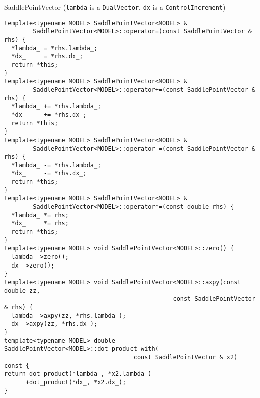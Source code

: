 \documentclass[9pt]{beamer}
\begin{document}
\begin{frame}[fragile]{SaddlePointVector (\lstinline|lambda| is a \lstinline|DualVector|, \lstinline|dx| is a \lstinline|ControlIncrement|) }
\begin{lstlisting}[basicstyle=\ttfamily\tiny]
template<typename MODEL> SaddlePointVector<MODEL> &
        SaddlePointVector<MODEL>::operator=(const SaddlePointVector & rhs) {
  *lambda_ = *rhs.lambda_;
  *dx_     = *rhs.dx_;
  return *this;
}
template<typename MODEL> SaddlePointVector<MODEL> &
        SaddlePointVector<MODEL>::operator+=(const SaddlePointVector & rhs) {
  *lambda_ += *rhs.lambda_;
  *dx_     += *rhs.dx_;
  return *this;
}
template<typename MODEL> SaddlePointVector<MODEL> &
        SaddlePointVector<MODEL>::operator-=(const SaddlePointVector & rhs) {
  *lambda_ -= *rhs.lambda_;
  *dx_     -= *rhs.dx_;
  return *this;
}
template<typename MODEL> SaddlePointVector<MODEL> &
        SaddlePointVector<MODEL>::operator*=(const double rhs) {
  *lambda_ *= rhs;
  *dx_     *= rhs;
  return *this;
}
template<typename MODEL> void SaddlePointVector<MODEL>::zero() {
  lambda_->zero();
  dx_->zero();
}
template<typename MODEL> void SaddlePointVector<MODEL>::axpy(const double zz,
                                               const SaddlePointVector & rhs) {
  lambda_->axpy(zz, *rhs.lambda_);
  dx_->axpy(zz, *rhs.dx_);
}
template<typename MODEL> double SaddlePointVector<MODEL>::dot_product_with(
                                    const SaddlePointVector & x2) const {
return dot_product(*lambda_, *x2.lambda_)
      +dot_product(*dx_, *x2.dx_);
}
\end{lstlisting}

\end{frame}
\end{document}
